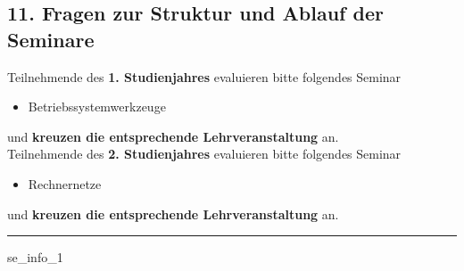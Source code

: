 \documentclass[a4paper,10pt]{article}
\makeatletter
\def\saveenum{\xdef\@savedenum{\the\c@enumi\relax}}
\makeatother
\begin{document}
{\begin{enumerate}
\end{enumerate} \saveenum

\vspace{-1cm}


\pagebreak



\subsection*{11. Fragen zur Struktur und Ablauf der Seminare}

Teilnehmende des \textbf{1. Studienjahres} evaluieren bitte folgendes Seminar
\begin{itemize}
	\item Betriebssystemwerkzeuge
\end{itemize}
und \textbf{kreuzen die entsprechende Lehrveranstaltung} an. \\

Teilnehmende des \textbf{2. Studienjahres} evaluieren bitte folgendes Seminar
\begin{itemize}
	\item Rechnernetze
\end{itemize}
und \textbf{kreuzen die entsprechende Lehrveranstaltung} an.

\vspace{.5cm}
\noindent\rule{\textwidth}{1pt}
\vspace{0.5cm}

\begin{questionmult}{se_info_1}
	\begin{choices}
	\end{choices}
\end{questionmult}


 \\

\begin{enumerate}


\end{enumerate}}
\end{document}
